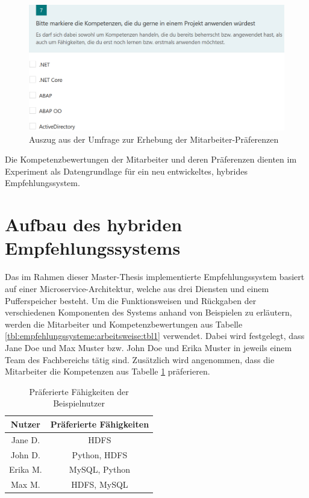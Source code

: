 \begin{figure}[h]
	\centering
	\includegraphics[width=1\textwidth]{gfx/Umfage_Faehigkeiten.png}
	\caption{Auszug aus der Umfrage zur Erhebung der Mitarbeiter-Präferenzen}
	\label{fig:methodik:versuchsaufbau:abb1}
\end{figure}

Die Kompetenzbewertungen der Mitarbeiter und deren Präferenzen dienten im Experiment als Datengrundlage für ein neu entwickeltes, hybrides Empfehlungssystem.

\section{Aufbau des hybriden Empfehlungssystems}
\label{ch:methodik:versuchsaufbau:systemarchitektur}
Das im Rahmen dieser Master-Thesis implementierte Empfehlungssystem basiert auf einer Microservice-Architektur, welche aus drei Diensten und einem Pufferspeicher besteht. Um die Funktionsweisen und Rückgaben der verschiedenen Komponenten des Systems anhand von Beispielen zu erläutern, werden die Mitarbeiter und Kompetenzbewertungen aus Tabelle \ref{tbl:empfehlungssysteme:arbeitsweise:tbl1} verwendet. Dabei wird festgelegt, dass Jane Doe und Max Muster bzw. John Doe und Erika Muster in jeweils einem Team des Fachbereichs \JES tätig sind. Zusätzlich wird angenommen, dass die Mitarbeiter die Kompetenzen aus Tabelle \ref{tbl:methodik:versuchsaufbau:systemarchitektur:tbl1} präferieren.

\begin{table}[h]
	\centering
	\begin{tabular}{c|c}
		\textbf{Nutzer} & \textbf{Präferierte Fähigkeiten}\\
		\hline
		Jane D.     & HDFS\\
		John D.     & Python, HDFS\\
		Erika M.    & MySQL, Python\\
		Max M.      & HDFS, MySQL
	\end{tabular}
	\caption{Präferierte Fähigkeiten der Beispielnutzer}
	\label{tbl:methodik:versuchsaufbau:systemarchitektur:tbl1}
\end{table}

